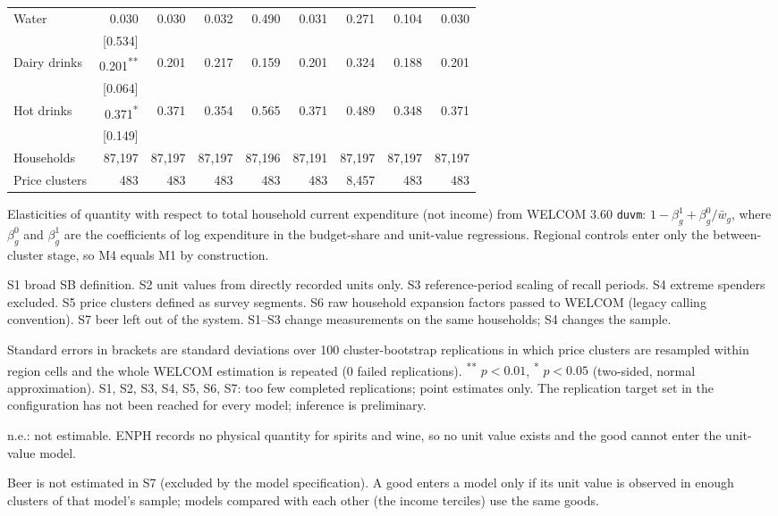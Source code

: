 \documentclass[
  11pt,
]{article}
\begin{document}
\begin{table}[!htbp]
\begin{threeparttable}
\begin{tabular}{lrrrrrrrr}
Water & 0.030 & 0.030 & 0.032 & 0.490 & 0.031 & 0.271 & 0.104 & 0.030 \\
 & [0.534] &  &  &  &  &  &  &  \\
Dairy drinks & 0.201\textsuperscript{**} & 0.201 & 0.217 & 0.159 & 0.201 & 0.324 & 0.188 & 0.201 \\
 & [0.064] &  &  &  &  &  &  &  \\
Hot drinks & 0.371\textsuperscript{*} & 0.371 & 0.354 & 0.565 & 0.371 & 0.489 & 0.348 & 0.371 \\
 & [0.149] &  &  &  &  &  &  &  \\
\addlinespace
Households & 87,197 & 87,197 & 87,197 & 87,196 & 87,191 & 87,197 & 87,197 & 87,197 \\
Price clusters & 483 & 483 & 483 & 483 & 483 & 8,457 & 483 & 483 \\
\bottomrule
\end{tabular}
\begin{tablenotes}[flushleft]
\footnotesize
\item Elasticities of quantity with respect to total household current expenditure (not income) from WELCOM 3.60 \texttt{duvm}: $1-\beta^1_g+\beta^0_g/\bar w_g$, where $\beta^0_g$ and $\beta^1_g$ are the coefficients of log expenditure in the budget-share and unit-value regressions. Regional controls enter only the between-cluster stage, so M4 equals M1 by construction.
\item S1 broad SB definition. S2 unit values from directly recorded units only. S3 reference-period scaling of recall periods. S4 extreme spenders excluded. S5 price clusters defined as survey segments. S6 raw household expansion factors passed to WELCOM (legacy calling convention). S7 beer left out of the system. S1--S3 change measurements on the same households; S4 changes the sample.
\item Standard errors in brackets are standard deviations over 100 cluster-bootstrap replications in which price clusters are resampled within region cells and the whole WELCOM estimation is repeated (0 failed replications). \textsuperscript{**} $p<0.01$, \textsuperscript{*} $p<0.05$ (two-sided, normal approximation). S1, S2, S3, S4, S5, S6, S7: too few completed replications; point estimates only. The replication target set in the configuration has not been reached for every model; inference is preliminary.
\item n.e.: not estimable. ENPH records no physical quantity for spirits and wine, so no unit value exists and the good cannot enter the unit-value model.
\item Beer is not estimated in S7 (excluded by the model specification). A good enters a model only if its unit value is observed in enough clusters of that model's sample; models compared with each other (the income terciles) use the same goods.
\end{tablenotes}
\end{threeparttable}
\end{table}
\end{document}
